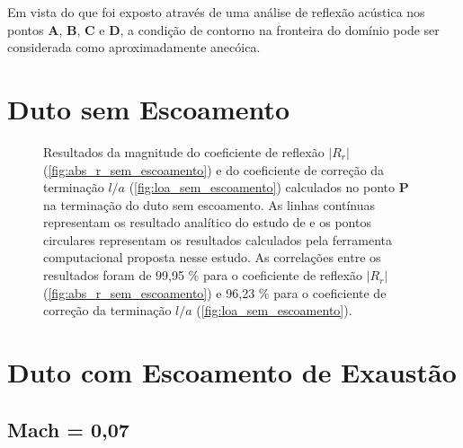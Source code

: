 \newpage
Em vista do que foi exposto através de uma análise de reflexão acústica nos pontos \textbf{A}, \textbf{B}, \textbf{C} e \textbf{D}, a condição de contorno na fronteira do domínio pode ser considerada como aproximadamente anecóica.

\section{Duto sem Escoamento}

\begin{figure}[ht!]
\begin{subfigure}{\scaleA \textwidth}
  
\end{subfigure}%
\begin{subfigure}{\scaleA \textwidth}
  
\end{subfigure}
\caption[Resultados de $|R_{r}|$ e $l/a$ sem escoamento]{Resultados da magnitude do coeficiente de reflexão $|R_{r}|$ (\ref{fig:abs_r_sem_escoamento}) e do coeficiente de correção da terminação $l/a$ (\ref{fig:loa_sem_escoamento}) calculados no ponto $\textbf{P}$ na terminação do duto sem escoamento. As linhas contínuas representam os resultado analítico do estudo de  e os pontos circulares representam os resultados calculados pela ferramenta computacional proposta nesse estudo. As correlações entre os resultados foram de 99,95 \% para o coeficiente de reflexão $|R_{r}|$ (\ref{fig:abs_r_sem_escoamento}) e 96,23 \% para o coeficiente de correção da terminação $l/a$ (\ref{fig:loa_sem_escoamento}).}
\label{fig:resultados_sem_escoamento}
\end{figure}


\newpage
\section{Duto com Escoamento de Exaustão}

\subsection{Mach = 0,07}

